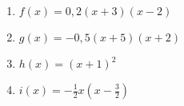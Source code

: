 \begin{Exercise}[title={Bestimme die Nullstellen und skizziere das Schaubild}, label=produktformNullstellenA2]
	
	\begin{minipage}{\textwidth}
		\begin{minipage}{0.49\textwidth}
			\begin{enumerate}[label=\alph*)]
				\item \(f(x)=0,2\left(x+3\right)\left(x-2\right)\)
				\item \(g(x)=-0,5\left(x+5\right)\left(x+2\right)\)
			\end{enumerate}
		\end{minipage}%
		\begin{minipage}{0.49\textwidth}
			\begin{enumerate}[label=\alph*)]
				\setcounter{enumi}{2}
				\item \(h(x)=\left(x+1\right)^2\)
				\item \(i(x)=-\frac{1}{2}x\left(x-\frac{3}{2}\right)\)
			\end{enumerate}
		\end{minipage}%
	\end{minipage}%
\end{Exercise}

